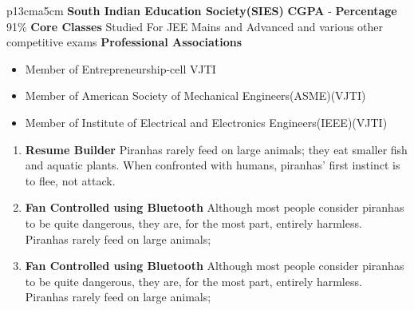 \documentclass{article}
\begin{document}
{\begin{longtable}{ p{13cm}a{5cm} }
\textbf{South Indian Education Society(SIES)} \newline   \textbf{CGPA} -  \hspace{1cm}      \textbf{Percentage} 91\% \hfill\textit{}\newline \textbf{Core Classes}
Studied For JEE Mains and Advanced and various other competitive exams \newline
\textbf{Professional Associations} 
\begin{itemize}[noitemsep,nolistsep]
	\item Member of Entrepreneurship-cell VJTI
    \item Member of American Society of Mechanical Engineers(ASME)(VJTI)
    \item Member of Institute of Electrical and Electronics Engineers(IEEE)(VJTI)\newline
\end{itemize} 


{}\newline

\begin{enumerate}
	\item {\textbf{Resume Builder}}\hfill \textit{}\newline
	Piranhas rarely feed on large animals; they eat smaller fish and aquatic plants. When confronted with humans, piranhas' first instinct is to flee, not attack. 
	\item {\textbf{Fan Controlled using Bluetooth}}\hfill \textit{}\newline
	Although most people consider piranhas to be quite dangerous, they are, for the most part, entirely harmless. Piranhas rarely feed on large animals;
	\item{\textbf{Fan Controlled using Bluetooth}}\hfill  \textit{}\newline
	Although most people consider piranhas to be quite dangerous, they are, for the most part, entirely harmless. Piranhas rarely feed on large animals; \newline
\end{enumerate}


{}\newline


\end{longtable}}
\end{document}
